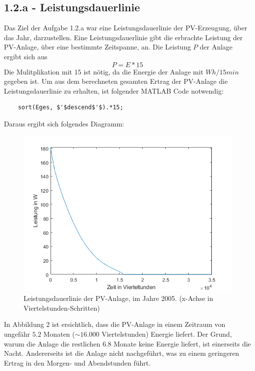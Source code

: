 \documentclass[a4paper,12pt]{article}
\begin{document}
	\subsection{1.2.a - Leistungsdauerlinie}
	Das Ziel der Aufgabe 1.2.a war eine Leistungsdauerlinie der PV-Erzeugung, über das Jahr, darzustellen.\newline
	Eine Leistungsdauerlinie gibt die erbrachte Leistung der PV-Anlage, über eine bestimmte Zeitspanne, an.\newline
	Die Leistung $P$ der Anlage ergibt sich aus
	\begin{equation}
	P=E*15
	\end{equation}
	Die Mulitplikation mit $15$ ist nötig, da die Energie der Anlage mit $Wh/15min$ gegeben ist.\newline
	Um aus dem berechneten gesamten Ertrag der PV-Anlage die Leistungsdauerlinie zu erhalten, ist folgender MATLAB Code notwendig:
	\begin{lstlisting}
	sort(Eges, $'$descend$'$).*15;
	\end{lstlisting}
	Daraus ergibt sich folgendes Diagramm:
	\begin{figure}[H]
		\centering
		\includegraphics[width=12cm]{img/results/Leistungsdauerlinie}
		\caption{Leistungsdauerlinie der PV-Anlage, im Jahre 2005. (x-Achse in Viertelstunden-Schritten)}
	\end{figure}
	In Abbildung 2 ist ersichtlich, dass die PV-Anlage in einem Zeitraum von ungefähr $5.2$ Monaten ($\sim 16.000$ Viertelstunden) Energie liefert. Der Grund, warum die Anlage die restlichen $6.8$ Monate keine Energie liefert, ist einerseits die Nacht. Andererseits ist die Anlage nicht nachgeführt, was zu einem geringeren Ertrag in den Morgen- und Abendstunden führt.
\end{document}
